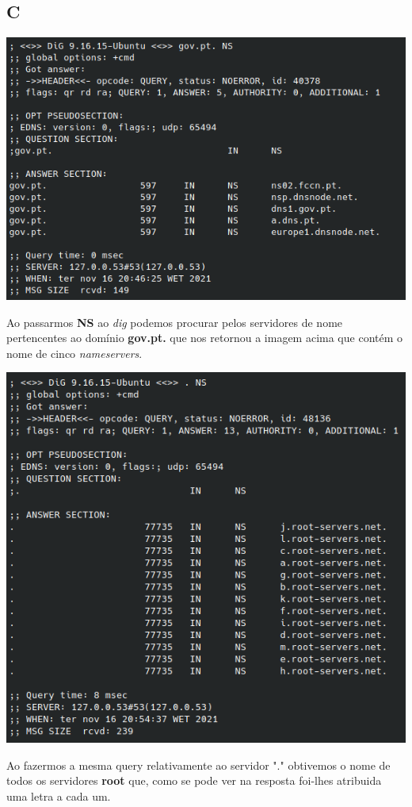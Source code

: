 \documentclass{report}
\begin{document}
        \subsection*{C}
            \noindent
            \includegraphics[width=\textwidth]{images/dig_gov.pt.png}
            \par
                Ao passarmos \textbf{NS} ao \textit{dig} podemos procurar pelos servidores de nome pertencentes ao domínio \textbf{gov.pt.} que nos retornou a imagem acima que contém o nome de cinco \textit{nameservers}.\par
            \noindent
            \includegraphics[width=\textwidth]{images/dig_root.png}
            \par
                Ao fazermos a mesma query relativamente ao servidor "." obtivemos o nome de todos os servidores \textbf{root} que, como se pode ver na resposta foi-lhes atribuida uma letra a cada um.
        \pagebreak
\end{document}

